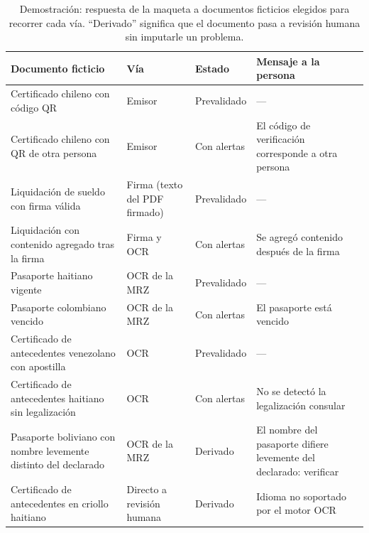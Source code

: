 \documentclass[11pt,a4paper]{article}
\begin{document}
\begin{table}[!htbp]
\centering
\caption{Demostración: respuesta de la maqueta a documentos ficticios elegidos para recorrer cada vía. ``Derivado'' significa que el documento pasa a revisión humana sin imputarle un problema.}
\label{tab:demo}
\small
\begin{tabularx}{\textwidth}{L >{\raggedright\arraybackslash}p{2.7cm} >{\raggedright\arraybackslash}p{1.9cm} >{\raggedright\arraybackslash}p{4.3cm}}
\toprule
\textbf{Documento ficticio} & \textbf{Vía} & \textbf{Estado} & \textbf{Mensaje a la persona} \\
\midrule
Certificado chileno con código QR & Emisor & Prevalidado & --- \\
Certificado chileno con QR de otra persona & Emisor & Con alertas & El código de verificación corresponde a otra persona \\
Liquidación de sueldo con firma válida & Firma (texto del PDF firmado) & Prevalidado & --- \\
Liquidación con contenido agregado tras la firma & Firma y OCR & Con alertas & Se agregó contenido después de la firma \\
Pasaporte haitiano vigente & OCR de la MRZ & Prevalidado & --- \\
Pasaporte colombiano vencido & OCR de la MRZ & Con alertas & El pasaporte está vencido \\
Certificado de antecedentes venezolano con apostilla & OCR & Prevalidado & --- \\
Certificado de antecedentes haitiano sin legalización & OCR & Con alertas & No se detectó la legalización consular \\
Pasaporte boliviano con nombre levemente distinto del declarado & OCR de la MRZ & Derivado & El nombre del pasaporte difiere levemente del declarado: verificar \\
Certificado de antecedentes en criollo haitiano & Directo a revisión humana & Derivado & Idioma no soportado por el motor OCR \\
\bottomrule
\end{tabularx}
\end{table}
\end{document}
